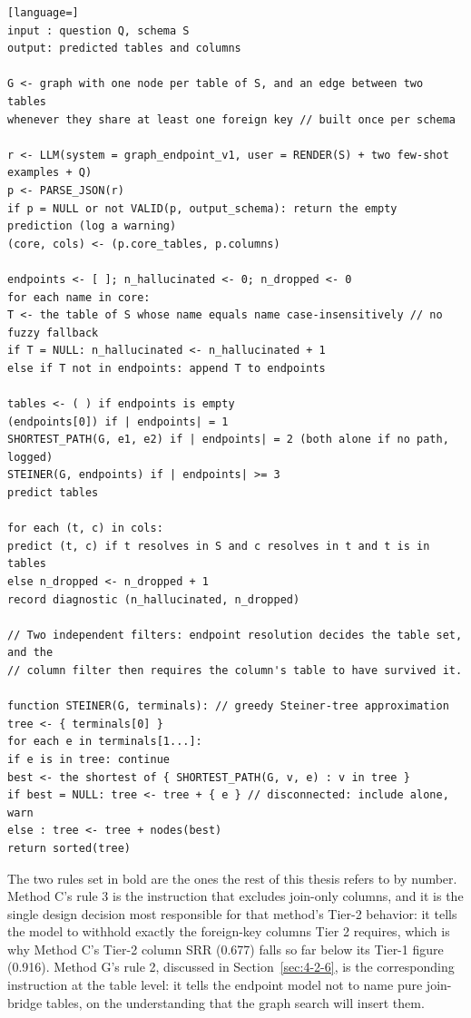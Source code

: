 \begin{lstlisting}[language=]
input : question Q, schema S
output: predicted tables and columns

G <- graph with one node per table of S, and an edge between two tables
whenever they share at least one foreign key // built once per schema

r <- LLM(system = graph_endpoint_v1, user = RENDER(S) + two few-shot examples + Q)
p <- PARSE_JSON(r)
if p = NULL or not VALID(p, output_schema): return the empty prediction (log a warning)
(core, cols) <- (p.core_tables, p.columns)

endpoints <- [ ]; n_hallucinated <- 0; n_dropped <- 0
for each name in core:
T <- the table of S whose name equals name case-insensitively // no fuzzy fallback
if T = NULL: n_hallucinated <- n_hallucinated + 1
else if T not in endpoints: append T to endpoints

tables <- ( ) if endpoints is empty
(endpoints[0]) if | endpoints| = 1
SHORTEST_PATH(G, e1, e2) if | endpoints| = 2 (both alone if no path, logged)
STEINER(G, endpoints) if | endpoints| >= 3
predict tables

for each (t, c) in cols:
predict (t, c) if t resolves in S and c resolves in t and t is in tables
else n_dropped <- n_dropped + 1
record diagnostic (n_hallucinated, n_dropped)

// Two independent filters: endpoint resolution decides the table set, and the
// column filter then requires the column's table to have survived it.

function STEINER(G, terminals): // greedy Steiner-tree approximation
tree <- { terminals[0] }
for each e in terminals[1...]:
if e is in tree: continue
best <- the shortest of { SHORTEST_PATH(G, v, e) : v in tree }
if best = NULL: tree <- tree + { e } // disconnected: include alone, warn
else : tree <- tree + nodes(best)
return sorted(tree)
\end{lstlisting}

The two rules set in bold are the ones the rest of this thesis refers to by number. Method C's rule 3 is the instruction that excludes join-only columns, and it is the single design decision most responsible for that method's Tier-2 behavior: it tells the model to withhold exactly the foreign-key columns Tier 2 requires, which is why Method C's Tier-2 column SRR (0.677) falls so far below its Tier-1 figure (0.916). Method G's rule 2, discussed in Section~\ref{sec:4-2-6}, is the corresponding instruction at the table level: it tells the endpoint model not to name pure join-bridge tables, on the understanding that the graph search will insert them.

